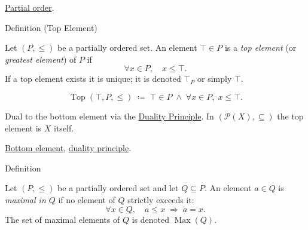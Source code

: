 \begin{dependencies}
\hyperref[def:lattice-order-partial-order]{Partial order}.
\end{dependencies}


\begin{definitionbox}{Definition (Top Element)}
\begin{definition}
\label{def:top-element}
Let $(P, \leq)$ be a partially ordered set.  An element $\top \in P$ is
a \emph{top element} (or \emph{greatest element}) of $P$ if
\[
\forall x \in P, \quad x \leq \top.
\]
If a top element exists it is unique; it is denoted $\top_P$ or simply
$\top$.
\end{definition}
\end{definitionbox}

\begin{remark*}
\[
\operatorname{Top}(\top, P, \leq)
\;\coloneqq\;
\top \in P \;\land\; \forall x \in P,\; x \leq \top.
\]
\end{remark*}

\begin{remark*}[Interpretation]
Dual to the bottom element via the
\hyperref[prop:duality-principle]{Duality Principle}.
In $(\mathcal{P}(X), \subseteq)$ the top element is $X$ itself.
\end{remark*}

\begin{dependencies}
\hyperref[def:bottom-element]{Bottom element},
\hyperref[prop:duality-principle]{duality principle}.
\end{dependencies}


\begin{definitionbox}{Definition}
\begin{definition}
\label{def:maximal-element}
Let $(P, \leq)$ be a partially ordered set and let $Q \subseteq P$.  An
element $a \in Q$ is \emph{maximal in $Q$} if no element of $Q$ strictly
exceeds it:
\[
\forall x \in Q, \quad a \leq x \;\Longrightarrow\; a = x.
\]
The set of maximal elements of $Q$ is denoted $\operatorname{Max}(Q)$.
\end{definition}
\end{definitionbox}

